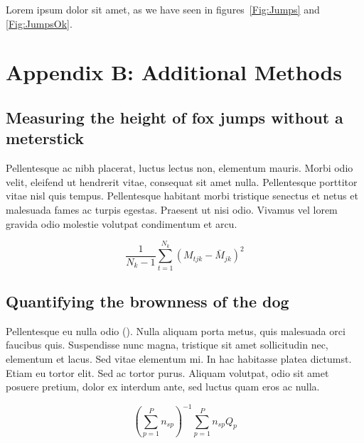 \documentclass[11pt]{article}
\begin{document}
Lorem ipsum dolor sit amet, as we have seen in figures~\ref{Fig:Jumps} and \ref{Fig:JumpsOk}.

\newpage{}

\section*{Appendix B: Additional Methods}

\subsection*{Measuring the height of fox jumps without a meterstick}

Pellentesque ac nibh placerat, luctus lectus non, elementum mauris. 
Morbi odio velit, eleifend ut hendrerit vitae, consequat sit amet 
nulla. Pellentesque porttitor vitae nisl quis tempus. Pellentesque 
habitant morbi tristique senectus et netus et malesuada fames ac 
turpis egestas. Praesent ut nisi odio. Vivamus vel lorem gravida 
odio molestie volutpat condimentum et arcu. 

\begin{equation}
{ \frac{1}{N_k-1} \sum \limits_{t=1}^{N_k} (M_{tjk} - \bar{M}_{jk})^2}
\end{equation}

\subsection*{Quantifying the brownness of the dog}

Pellentesque eu nulla odio (\citealt{Xiao2015,CookEtAl2015}). Nulla aliquam porta metus, quis malesuada orci faucibus quis. Suspendisse nunc magna, tristique sit amet sollicitudin nec, elementum et lacus. Sed vitae elementum mi. In hac habitasse platea dictumst. Etiam eu tortor elit. Sed ac tortor purus. Aliquam volutpat, odio sit amet posuere pretium, dolor ex interdum ante, sed luctus quam eros ac nulla. 

\begin{equation}
{ (\sum \limits_{p=1}^P {n_{sp}})^{-1}\sum \limits_{p=1}^P {n_{sp}Q_{p}}}
\end{equation}

\newpage{}

\end{document}
